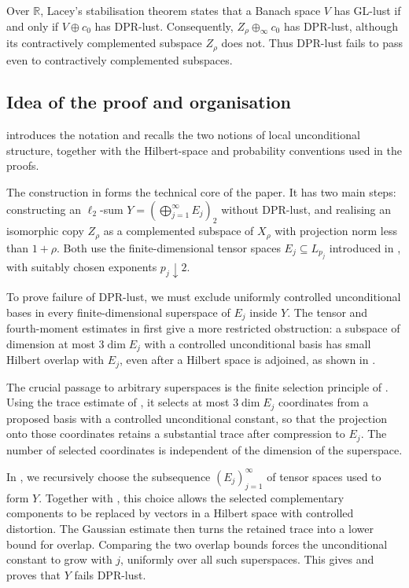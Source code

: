 \documentclass[11pt,a4paper,reqno]{amsart}
\theoremstyle{definition}
\newcommand{\R}{\mathbb R}
\numberwithin{equation}{section}
\begin{document}
Over $\R$, Lacey's stabilisation theorem \cite[p.~49, second Corollary]{Lacey1977} states that a Banach space $V$ has GL-lust if and only if $V\oplus c_0$ has DPR-lust. Consequently, $Z_\rho\oplus_\infty c_0$ has DPR-lust, although its contractively complemented subspace $Z_\rho$ does not. Thus DPR-lust fails to pass even to contractively complemented subspaces.

\subsection*{Idea of the proof and organisation}

 introduces the notation and recalls the two notions of local unconditional structure, together with the Hilbert-space and probability conventions used in the proofs.

The construction in  forms the technical core of the paper. It has two main steps: constructing an $\ell_2$-sum $Y=(\bigoplus_{j=1}^{\infty}E_j)_2$ without DPR-lust, and realising an isomorphic copy $Z_\rho$ as a complemented subspace of $X_\rho$ with projection norm less than $1+\rho$. Both use the finite-dimensional tensor spaces $E_j\subseteq L_{p_j}$ introduced in , with suitably chosen exponents $p_j\downarrow2$.

To prove failure of DPR-lust, we must exclude uniformly controlled unconditional bases in every finite-dimensional superspace of $E_j$ inside $Y$. The tensor and fourth-moment estimates in  first give a more restricted obstruction: a subspace of dimension at most $3\dim E_j$ with a controlled unconditional basis has small Hilbert overlap with $E_j$, even after a Hilbert space is adjoined, as shown in .

The crucial passage to arbitrary superspaces is the finite selection principle of . Using the trace estimate of , it selects at most $3\dim E_j$ coordinates from a proposed basis with a controlled unconditional constant, so that the projection onto those coordinates retains a substantial trace after compression to $E_j$. The number of selected coordinates is independent of the dimension of the superspace.

In , we recursively choose the subsequence $(E_j)_{j=1}^{\infty}$ of tensor spaces used to form $Y$. Together with , this choice allows the selected complementary components to be replaced by vectors in a Hilbert space with controlled distortion. The Gaussian estimate then turns the retained trace into a lower bound for overlap. Comparing the two overlap bounds forces the unconditional constant to grow with $j$, uniformly over all such superspaces. This gives  and proves that $Y$ fails DPR-lust.
\end{document}
